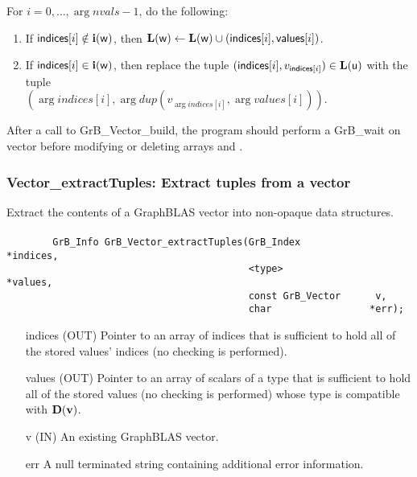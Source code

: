 For $i = 0,\ldots,\arg{nvals}-1$, do the following:
\begin{enumerate}
    \item If $\arg{indices}[i] \notin \bold{i}(\arg{w})$, then $\bold{L}(\arg{w}) \leftarrow \bold{L}(\arg{w}) \cup (\arg{indices}[i], \arg{values}[i])$.
    \item If $\arg{indices}[i] \in \bold{i}(\arg{w})$, then replace the tuple $(\arg{indices}[i], v_{\arg{indices}[i]}) \in \bold{L}(\arg{u})$ with the tuple \\ $(\arg{indices}[i], \arg{dup}(v_{\arg{indices}[i]},\arg{values}[i]))$.
\end{enumerate}



After a call to {\sf GrB\_Vector\_build}, the program should perform a 
{\sf GrB\_wait} on vector  before
modifying or deleting arrays  and .


\subsubsection{{\sf Vector\_extractTuples}: Extract tuples from a vector}
\label{Sec:Vector_extractTuples}

Extract the contents of a GraphBLAS vector into non-opaque data structures.

\paragraph{\syntax}

\begin{verbatim}
        GrB_Info GrB_Vector_extractTuples(GrB_Index            *indices,
                                          <type>               *values, 
                                          const GrB_Vector      v,
                                          char                 *err);

\end{verbatim}

\begin{itemize}[leftmargin=1.1in]
    \item[{\sf indices}] ({\sf OUT}) Pointer to an array of indices that is sufficient to
                        hold all of the stored values' indices (no checking is performed).
    \item[{\sf values}] ({\sf OUT}) Pointer to an array of scalars of a type that is sufficient to
                        hold all of the stored values (no checking is performed) whose
                        type is compatible with $\bold{D}(\vector{v})$.
    \item[{\sf v}]      ({\sf IN})  An existing GraphBLAS vector.
    \item[{\sf err}]     A null terminated string containing additional error information.
\end{itemize}

